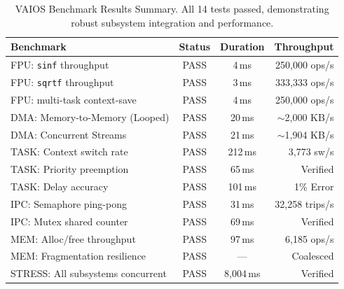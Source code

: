 \begin{table}[H]
    \centering
    \small
    \begin{tabularx}{\textwidth}{|X|c|c|r|}
        \hline
        \textbf{Benchmark} & \textbf{Status} & \textbf{Duration} & \textbf{Throughput} \\
        \hline
        FPU: \texttt{sinf} throughput & \cellcolor{green!10}PASS & 4\,ms & 250,000 ops/s \\
        FPU: \texttt{sqrtf} throughput & \cellcolor{green!10}PASS & 3\,ms & 333,333 ops/s \\
        FPU: multi-task context-save & \cellcolor{green!10}PASS & 4\,ms & 250,000 ops/s \\
        \hline
        DMA: Memory-to-Memory (Looped) & \cellcolor{green!10}PASS & 20\,ms & $\sim$2,000 KB/s \\
        DMA: Concurrent Streams & \cellcolor{green!10}PASS & 21\,ms & $\sim$1,904 KB/s \\
        \hline
        TASK: Context switch rate & \cellcolor{green!10}PASS & 212\,ms & 3,773 sw/s \\
        TASK: Priority preemption & \cellcolor{green!10}PASS & 65\,ms & Verified \\
        TASK: Delay accuracy & \cellcolor{green!10}PASS & 101\,ms & 1\% Error \\
        \hline
        IPC: Semaphore ping-pong & \cellcolor{green!10}PASS & 31\,ms & 32,258 trips/s \\
        IPC: Mutex shared counter & \cellcolor{green!10}PASS & 69\,ms & Verified \\
        \hline
        MEM: Alloc/free throughput & \cellcolor{green!10}PASS & 97\,ms & 6,185 ops/s \\
        MEM: Fragmentation resilience & \cellcolor{green!10}PASS & --- & Coalesced \\
        \hline
        STRESS: All subsystems concurrent & \cellcolor{green!10}PASS & 8,004\,ms & Verified \\
        \hline
    \end{tabularx}
    \caption{VAIOS Benchmark Results Summary. All 14 tests passed, demonstrating robust subsystem integration and performance.}
    \label{tab:vaios_benchmarks_summary}
\end{table}

